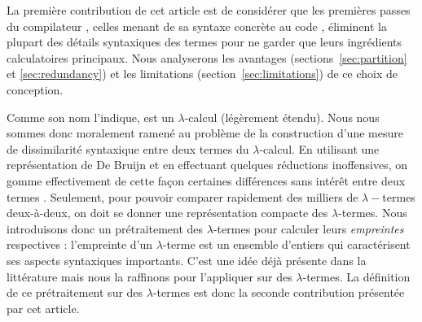 La première contribution de cet article est de considérer que les
premières passes du compilateur {\OCaml}, celles menant de sa syntaxe
concrète au code {\LambdaCode}, éliminent la plupart des détails
syntaxiques des termes {\OCaml} pour ne garder que leurs ingrédients
calculatoires principaux. Nous analyserons les avantages
(sections~\ref{sec:partition} et \ref{sec:redundancy}) et les
limitations (section~\ref{sec:limitations}) de ce choix de conception.

Comme son nom l'indique, {\LambdaCode} est un $\lambda$-calcul
(légèrement étendu). Nous nous sommes donc moralement ramené au
problème de la construction d'une mesure de dissimilarité syntaxique
entre deux termes du $\lambda$-calcul. En utilisant une représentation
de De Bruijn et en effectuant quelques réductions inoffensives, on
gomme effectivement de cette façon certaines différences sans intérêt
entre deux termes {\OCaml}. Seulement, pour pouvoir comparer
rapidement des milliers de $\lambda-$termes deux-à-deux, on doit se
donner une représentation compacte des $\lambda$-termes. Nous
introduisons donc un prétraitement
%
des $\lambda$-termes pour calculer leurs \textit{empreintes}
respectives : l'empreinte d'un $\lambda$-terme est un ensemble
d'entiers qui caractérisent ses aspects syntaxiques importants. C'est
une idée déjà présente dans la littérature mais nous la raffinons pour
l'appliquer sur des $\lambda$-termes.  La définition de ce
prétraitement sur des $\lambda$-termes est donc la seconde
contribution présentée par cet article.

